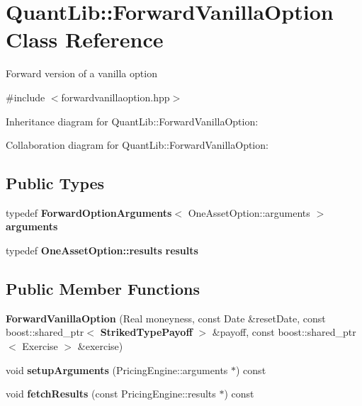 \section{Quant\+Lib\+:\+:Forward\+Vanilla\+Option Class Reference}
\label{class_quant_lib_1_1_forward_vanilla_option}


Forward version of a vanilla option  




{\ttfamily \#include $<$forwardvanillaoption.\+hpp$>$}



Inheritance diagram for Quant\+Lib\+:\+:Forward\+Vanilla\+Option\+:


Collaboration diagram for Quant\+Lib\+:\+:Forward\+Vanilla\+Option\+:
\subsection*{Public Types}
\begin{DoxyCompactItemize}
\item 
typedef {\bf Forward\+Option\+Arguments}$<$ One\+Asset\+Option\+::arguments $>$ {\bfseries arguments}\label{class_quant_lib_1_1_forward_vanilla_option_a7960220cfa66d5d5d212db2472543c76}

\item 
typedef {\bf One\+Asset\+Option\+::results} {\bfseries results}\label{class_quant_lib_1_1_forward_vanilla_option_a0b3f9ea897417c98f224d78ac6dce3ca}

\end{DoxyCompactItemize}
\subsection*{Public Member Functions}
\begin{DoxyCompactItemize}
\item 
{\bfseries Forward\+Vanilla\+Option} (Real moneyness, const Date \&reset\+Date, const boost\+::shared\+\_\+ptr$<$ {\bf Striked\+Type\+Payoff} $>$ \&payoff, const boost\+::shared\+\_\+ptr$<$ Exercise $>$ \&exercise)\label{class_quant_lib_1_1_forward_vanilla_option_a7963eaeb32d825438e4a985ce80b66ac}

\item 
void {\bfseries setup\+Arguments} (Pricing\+Engine\+::arguments $\ast$) const \label{class_quant_lib_1_1_forward_vanilla_option_a2e896e4b3ef60ae05cdae0c3b377fa15}

\item 
void {\bfseries fetch\+Results} (const Pricing\+Engine\+::results $\ast$) const \label{class_quant_lib_1_1_forward_vanilla_option_a1432219fdbd930afc8367c08a2aec7f4}

\end{DoxyCompactItemize}
